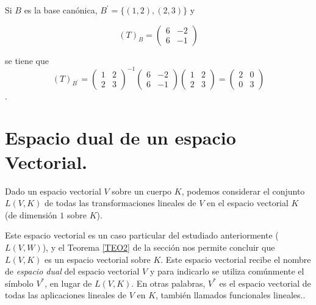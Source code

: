 \begin{example}
\label{ejemplo217}

Si $B$ es la base canónica, $B^{\prime}=\{ (1,2), (2,3) \}$ y  

$$(T)_{B}= \left(   \begin{array}{cc} 6 & -2 \\ 6 &  -1   \end{array} \right )$$

se tiene que 
 $$(T)_{B^{\prime}}= \left(   \begin{array}{cc} 1 & 2 \\ 2 &  3   \end{array} \right )^{-1}\left(   \begin{array}{cc} 6 & -2 \\ 6 &  -1   \end{array} \right ) \left(   \begin{array}{cc} 1 & 2 \\ 2 &  3   \end{array} \right )   = \left(   \begin{array}{cc} 2 & 0 \\ 0 &  3   \end{array} \right )$$.
\end{example}


\bigskip

\section{Espacio dual de un espacio Vectorial.}


Dado un espacio vectorial $V$ sobre un cuerpo $K$, podemos considerar el conjunto $L(V,K)$ de todas las transformaciones lineales de $V$ en el espacio vectorial  $K$ (de dimensión  $1$ sobre $K$). 

\bigskip


Este espacio vectorial es un caso particular del estudiado anteriormente ($L(V,W)$), y el Teorema \ref{TEO2} de la sección nos permite concluir que $L(V,K)$ es un espacio vectorial sobre $K$. Este espacio vectorial recibe el nombre de \textit{espacio dual} del espacio vectorial $V$  y para indicarlo se utiliza comúnmente el símbolo $V^*$, en lugar de $L(V,K)$. En otras palabras, $V^*$ es el espacio vectorial de todas las aplicaciones lineales de $V$ en $K$, también llamados funcionales lineales..



\bigskip



